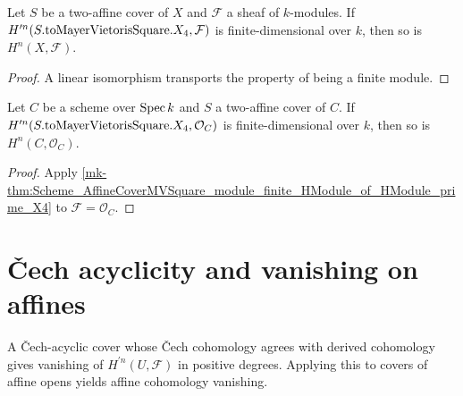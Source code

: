 \begin{theorem}\label{mk-thm:Scheme_AffineCoverMVSquare_module_finite_HModule_of_HModule_prime_X4}
  \leanok


  Let \(S\) be a two-affine cover of \(X\) and \(\mathcal F\) a sheaf of \(k\)-modules. If \(H^{\prime n}(S.\mathrm{toMayerVietorisSquare}.X_4, \mathcal F)\) is finite-dimensional over \(k\), then so is \(H^{n}(X, \mathcal F)\).
\end{theorem}

\begin{proof}
  \leanok


A linear isomorphism transports the property of being a finite module.
\end{proof}

\begin{theorem}\label{mk-thm:Scheme_AffineCoverMVSquare_module_finite_HModule_of_HModule_prime_X4_curve}
  \leanok


  Let \(C\) be a scheme over \(\operatorname{Spec} k\) and \(S\) a two-affine cover of \(C\). If \(H^{\prime n}(S.\mathrm{toMayerVietorisSquare}.X_4, \mathcal O_C)\) is finite-dimensional over \(k\), then so is \(H^{n}(C, \mathcal O_C)\).
\end{theorem}

\begin{proof}
  \leanok


Apply \ref{mk-thm:Scheme_AffineCoverMVSquare_module_finite_HModule_of_HModule_prime_X4} to \(\mathcal F=\mathcal O_C\).
\end{proof}

\section{\v{C}ech acyclicity and vanishing on affines}
\label{mk-sec:cech_acyclicity}

A \v{C}ech-acyclic cover whose \v{C}ech cohomology agrees with derived cohomology gives vanishing of \(H^{\prime n}(U,\mathcal F)\) in positive degrees. Applying this to covers of affine opens yields affine cohomology vanishing.

